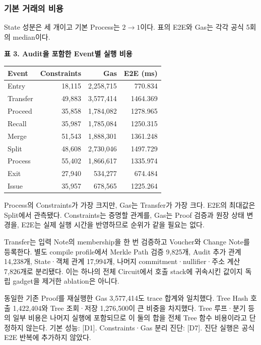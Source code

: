 \subsubsection*{기본 거래의 비용}
State 성분은 세 개이고 기본 Process는 $2\to1$이다. 표의 E2E와 Gas는 각각 공식 5회의 median이다.
\begin{center}\small\setlength{\tabcolsep}{6pt}
    \textbf{표 3. Audit을 포함한 Event별 실행 비용}\par\smallskip
    \begin{tabular}{@{}lrrr@{}}\toprule
        \textbf{Event} & \textbf{Constraints} & \textbf{Gas} & \textbf{E2E (ms)} \\ \midrule
        Entry          & 18,115               & 2,258,715    & 770.834           \\
        Transfer       & 49,883               & 3,577,414    & 1464.369          \\
        Proceed        & 35,858               & 1,784,082    & 1278.965          \\
        Recall         & 35,987               & 1,785,084    & 1250.315          \\
        Merge          & 51,543               & 1,888,301    & 1361.248          \\
        Split          & 48,608               & 2,730,046    & 1497.729          \\
        Process        & 55,402               & 1,866,617    & 1335.974          \\
        Exit           & 27,940               & 534,277      & 674.484           \\
        Issue          & 35,957               & 678,565      & 1225.264          \\
        \bottomrule\end{tabular}\end{center}

Process의 Constraints가 가장 크지만, Gas는 Transfer가 가장 크다. E2E의 최대값은 Split에서 관측됐다.
Constraints는 증명할 관계를, Gas는 Proof 검증과 원장 상태 변경을, E2E는 실제 실행 시간을 반영하므로 순위가 같을 필요는 없다.

Transfer는 입력 Note의 membership을 한 번 검증하고 Voucher와 Change Note를 등록한다.
별도 compile profile에서 Merkle Path 검증 9,825개, Audit 추가 관계 14,238개, State·객체 관계 17,994개, 나머지 commitment·nullifier·주소 계산 7,826개로 분리됐다.
이는 하나의 전체 Circuit에서 호출 stack에 귀속시킨 값이지 독립 gadget을 제거한 ablation은 아니다.

동일한 기존 Proof를 재실행한 Gas 3,577,414도 trace 합계와 일치했다.
Tree Hash 호출 1,422,404와 Tree 조회·저장 1,276,500이 큰 비중을 차지했다.
Tree 루프·분기 등의 일부 비용은 나머지 실행에 포함되므로 이 둘의 합을 전체 Tree 함수 비용이라고 단정하지 않는다.
    {\small 기본 성능: [D1]. Constraints·Gas 분리 진단: [D7]. 진단 실행은 공식 E2E 반복에 추가하지 않았다.}\par

